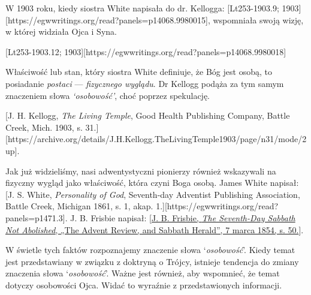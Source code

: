W 1903 roku, kiedy siostra White napisała do dr. Kellogga: [Lt253-1903.9; 1903][https://egwwritings.org/read?panels=p14068.9980015], wspomniała swoją wizję, w której widziała Ojca i Syna.

[Lt253-1903.12; 1903][https://egwwritings.org/read?panels=p14068.9980018]

Właściwość lub stan, który siostra White definiuje, że Bóg jest osobą, to posiadanie \textit{postaci} — \textit{fizycznego wyglądu}. Dr Kellogg podąża za tym samym znaczeniem słowa \textit{‘osobowość’}, choć poprzez spekulację.

[J. H. Kellogg, \textit{The Living Temple}, Good Health Publishing Company, Battle Creek, Mich. 1903, s. 31.][https://archive.org/details/J.H.Kellogg.TheLivingTemple1903/page/n31/mode/2up].

Jak już widzieliśmy, nasi adwentystyczni pionierzy również wskazywali na fizyczny wygląd jako właściwość, która czyni Boga osobą. James White napisał: [J. S. White, \textit{Personality of God}, Seventh-day Adventist Publishing Association, Battle Creek, Michigan 1861, s. 1, akap. 1.][https://egwwritings.org/read?panels=p1471.3]. J. B. Frisbie napisał: [\href{https://documents.adventistarchives.org/Periodicals/RH/RH18540307-V05-07.pdf}{J. B. Frisbie, \textit{The Seventh-Day Sabbath Not Abolished}, „The Advent Review, and Sabbath Herald”, 7 marca 1854, s. 50.}].

W świetle tych faktów rozpoznajemy znaczenie słowa ‘\textit{osobowość}’. Kiedy temat  jest przedstawiany w związku z doktryną o Trójcy, istnieje tendencja do zmiany znaczenia słowa ‘\textit{osobowość}’. Ważne jest również, aby wspomnieć, że temat  dotyczy osobowości Ojca. Widać to wyraźnie z przedstawionych informacji.

